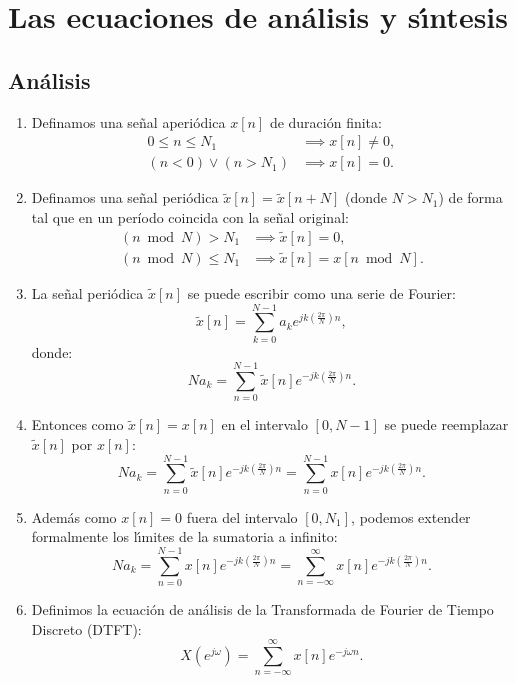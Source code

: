 \documentclass[11pt,a4paper,openany]{book}
\begin{document}
\section{Las ecuaciones de an\'{a}lisis y s\'{\i}ntesis}

\subsection{An\'{a}lisis}

\begin{enumerate}
	\item Definamos una se\~{n}al aperi\'{o}dica $x[n]$ de duración finita:
	\begin{align}
		0 \leq n \leq N_{1} &\implies x[n] \neq 0, \\
		(n < 0) \vee (n > N_{1}) &\implies x[n] = 0.
	\end{align}
	
	\item Definamos una se\~{n}al peri\'{o}dica $\tilde{x}[n] = \tilde{x}[n+N]$ (donde $N > N_{1}$) de forma tal que en un período coincida con la señal original:
	\begin{align}
		(n \bmod N) > N_{1} &\implies \tilde{x}[n] = 0, \\ 
		(n \bmod N) \leq N_{1} &\implies \tilde{x}[n] = x[n \bmod N].
	\end{align}
	
	\item La se\~{n}al peri\'{o}dica $\tilde{x}[n]$ se puede escribir como una serie de Fourier:
	\begin{equation}
		\tilde{x}[n] = \sum_{k=0}^{N-1} a_{k} e^{jk\left(\frac{2\pi}{N}\right)n},
	\end{equation}
	donde:
	\begin{equation}
		N a_{k} = \sum_{n=0}^{N-1} \tilde{x}[n] e^{-jk\left(\frac{2\pi}{N}\right)n}.
	\end{equation}
	
	\item Entonces como $\tilde{x}[n] = x[n]$ en el intervalo $[0,N-1]$ se puede reemplazar $\tilde{x}[n]$ por $x[n]$:
	\begin{equation}
		N a_{k} = \sum_{n=0}^{N-1} \tilde{x}[n] e^{-jk\left(\frac{2\pi}{N}\right)n} = \sum_{n=0}^{N-1} x[n] e^{-jk\left(\frac{2\pi}{N}\right)n}.
	\end{equation}
	
	\item Adem\'{a}s como $x[n] = 0$ fuera del intervalo $[0,N_{1}]$, podemos extender formalmente los l\'{\i}mites de la sumatoria a infinito:
	\begin{equation}
		N a_{k} = \sum_{n=0}^{N-1} x[n] e^{-jk\left(\frac{2\pi}{N}\right)n} = \sum_{n=-\infty}^{\infty} x[n] e^{-jk\left(\frac{2\pi}{N}\right)n}.
	\end{equation}
	
	\item Definimos la ecuaci\'{o}n de an\'{a}lisis de la Transformada de Fourier de Tiempo Discreto (DTFT):
	\begin{equation}
		X(e^{j\omega}) = \sum_{n=-\infty}^{\infty} x[n] e^{-j\omega n}.
	\end{equation}
\end{enumerate}
\end{document}
